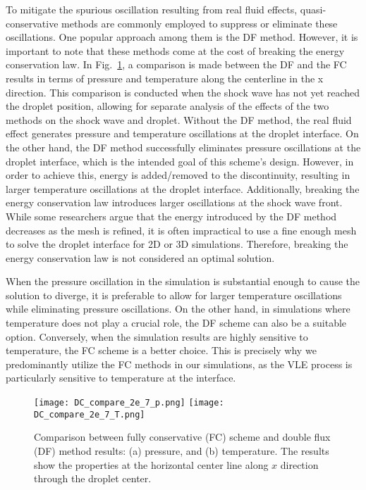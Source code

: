 To mitigate the spurious oscillation resulting from real fluid effects, quasi-conservative methods are commonly employed to suppress or eliminate these oscillations. One popular approach among them is the DF method. However, it is important to note that these methods come at the cost of breaking the energy conservation law. In Fig.~\ref{droplet_DC_compare}, a comparison is made between the DF and the FC results in terms of pressure and temperature along the centerline in the x direction. This comparison is conducted when the shock wave has not yet reached the droplet position, allowing for separate analysis of the effects of the two methods on the shock wave and droplet. Without the DF method, the real fluid effect generates pressure and temperature oscillations at the droplet interface. On the other hand, the DF method successfully eliminates pressure oscillations at the droplet interface, which is the intended goal of this scheme's design. However, in order to achieve this, energy is added/removed to the discontinuity, resulting in larger temperature oscillations at the droplet interface. Additionally, breaking the energy conservation law introduces larger oscillations at the shock wave front. While some researchers argue that the energy introduced by the DF method decreases as the mesh is refined, it is often impractical to use a fine enough mesh to solve the droplet interface for 2D or 3D simulations. Therefore, breaking the energy conservation law is not considered an optimal solution.

When the pressure oscillation in the simulation is substantial enough to cause the solution to diverge, it is preferable to allow for larger temperature oscillations while eliminating pressure oscillations. On the other hand, in simulations where temperature does not play a crucial role, the DF scheme can also be a suitable option. Conversely, when the simulation results are highly sensitive to temperature, the FC scheme is a better choice. This is precisely why we predominantly utilize the FC methods in our simulations, as the VLE process is particularly sensitive to temperature at the interface.



\begin{figure}[htbp]
	\centering
	\texttt{[image: DC\_compare\_2e\_7\_p.png]}
	\texttt{[image: DC\_compare\_2e\_7\_T.png]}
	\caption{Comparison between fully conservative (FC) scheme and double flux (DF) method results: (a) pressure, and (b) temperature. The results show the properties at the horizontal center line along $x$ direction through the droplet center.}
	\label{droplet_DC_compare}
\end{figure}


